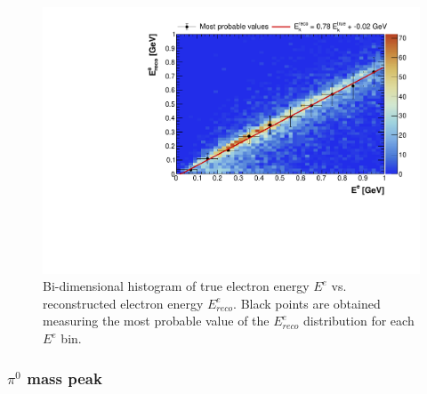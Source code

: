 \begin{figure}[htbp]
\centering
\includegraphics[width=0.65\columnwidth]{figures/ecalib.pdf}
\caption{Bi-dimensional histogram of true electron energy $E^{e}$ vs. reconstructed electron energy $E_{reco}^{e}$. Black points are obtained measuring the most probable value of the $E_{reco}^{e}$ distribution for each $E^{e}$ bin.}
\label{fig:ecalib}
\end{figure}



\subsubsection{\texorpdfstring{$\pi^0$}{pi0} mass peak}

